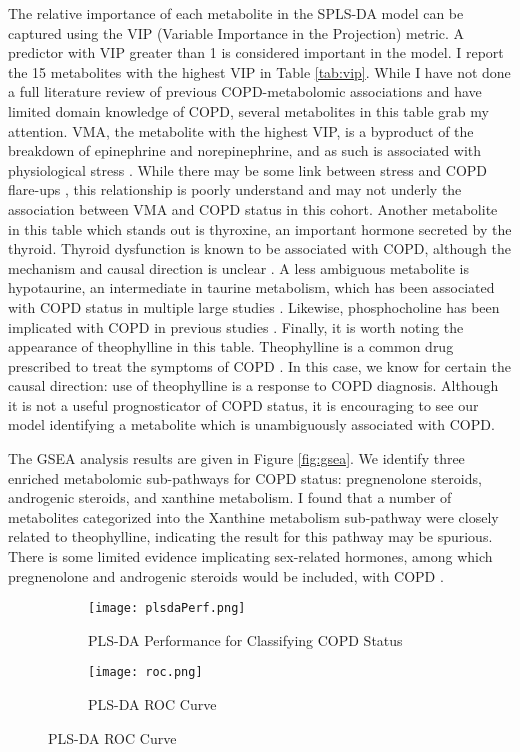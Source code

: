 \documentclass{article}
\begin{document}
The relative importance of each metabolite in the SPLS-DA model can be captured using the VIP (Variable Importance in the Projection) metric. A predictor with VIP greater than 1 is considered important in the model. I report the 15 metabolites with the highest VIP in Table \ref{tab:vip}. While I have not done a full literature review of previous COPD-metabolomic associations and have limited domain knowledge of COPD, several metabolites in this table grab my attention. VMA, the metabolite with the highest VIP, is a byproduct of the breakdown of epinephrine and norepinephrine, and as such is associated with physiological stress \cite{chapman29OrganicAcid2020}. While there may be some link between stress and COPD flare-ups \cite{COPDManagingStress}, this relationship is poorly understand and may not underly the association between VMA and COPD status in this cohort. Another metabolite in this table which stands out is thyroxine, an important hormone secreted by the thyroid. Thyroid dysfunction is known to be associated with COPD, although the mechanism and causal direction is unclear \cite{milkowska-dymanowskaThyroidGlandChronic2017}. A less ambiguous metabolite is hypotaurine, an intermediate in taurine metabolism, which has been associated with COPD status in multiple large studies \cite{godboleMetabolomeFeaturesCOPD2022}. Likewise, phosphocholine has been implicated with COPD in previous studies \cite{gillenwaterMetabolomicProfilingReveals2021}. Finally, it is worth noting the appearance of theophylline in this table. Theophylline is a common drug prescribed to treat the symptoms of COPD \cite{TheophyllineMedlinePlusDrug}. In this case, we know for certain the causal direction: use of theophylline is a response to COPD diagnosis. Although it is not a useful prognosticator of COPD status, it is encouraging to see our model identifying a metabolite which is unambiguously associated with COPD.

The GSEA analysis results are given in Figure \ref{fig:gsea}. We identify three enriched metabolomic sub-pathways for COPD status: pregnenolone steroids, androgenic steroids, and xanthine metabolism. I found that a number of metabolites categorized into the Xanthine metabolism sub-pathway were closely related to theophylline, indicating the result for this pathway may be spurious. There is some limited evidence implicating sex-related hormones, among which pregnenolone and androgenic steroids would be included, with COPD \cite{tamRoleFemaleHormones2011}.

\begin{figure}
  \centering
  \begin{subfigure}[b]{0.4\textwidth}
    \caption{PLS-DA Performance for Classifying COPD Status}
    \texttt{[image: plsdaPerf.png]}
    \label{fig:perf}
  \end{subfigure}
  \begin{subfigure}[b]{0.45\textwidth}
    \caption{PLS-DA ROC Curve}
    \texttt{[image: roc.png]}
    \centering
    \label{fig:roc}
  \end{subfigure}
\end{figure}
\end{document}
